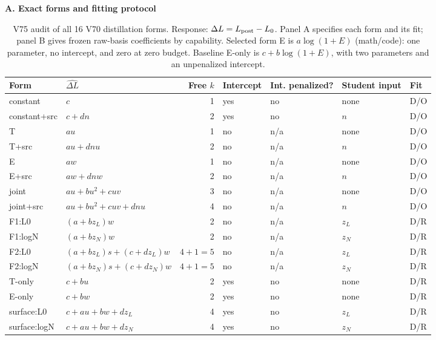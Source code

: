 \begin{table}[H]
\centering
\scriptsize
\setlength{\tabcolsep}{3pt}
\caption{V75 audit of all 16 V70 distillation forms. Response: $\Delta L=L_{\rm post}-L_0$. Panel A specifies each form and its fit; panel B gives frozen raw-basis coefficients by capability. Selected form E is $a\log(1+E)$ (math/code): one parameter, no intercept, and zero at zero budget. Baseline E-only is $c+b\log(1+E)$, with two parameters and an unpenalized intercept.}
\label{tab:distill_forms_audit}
\textbf{A. Exact forms and fitting protocol}\par\smallskip
\begin{tabular}{@{}llrllll@{}}
\toprule
Form & $\widehat{\Delta L}$ & Free $k$ & Intercept & Int. penalized? & Student input & Fit \\
\midrule
constant & $c$ & 1 & yes & no & none & D/O \\
constant+src & $c+d n$ & 2 & yes & no & $n$ & D/O \\
T & $a u$ & 1 & no & n/a & none & D/O \\
T+src & $a u+d n u$ & 2 & no & n/a & $n$ & D/O \\
E & $a w$ & 1 & no & n/a & none & D/O \\
E+src & $a w+d n w$ & 2 & no & n/a & $n$ & D/O \\
joint & $a u+b u^2+c u v$ & 3 & no & n/a & none & D/O \\
joint+src & $a u+b u^2+c u v+d n u$ & 4 & no & n/a & $n$ & D/O \\
F1:L0 & $(a+b z_L)w$ & 2 & no & n/a & $z_L$ & D/R \\
F1:logN & $(a+b z_N)w$ & 2 & no & n/a & $z_N$ & D/R \\
F2:L0 & $(a+b z_L)s+(c+d z_L)w$ & $4+1=5$ & no & n/a & $z_L$ & D/R \\
F2:logN & $(a+b z_N)s+(c+d z_N)w$ & $4+1=5$ & no & n/a & $z_N$ & D/R \\
T-only & $c+b u$ & 2 & yes & no & none & D/R \\
E-only & $c+b w$ & 2 & yes & no & none & D/R \\
surface:L0 & $c+a u+b w+d z_L$ & 4 & yes & no & $z_L$ & D/R \\
surface:logN & $c+a u+b w+d z_N$ & 4 & yes & no & $z_N$ & D/R \\
\bottomrule
\end{tabular}
\par\smallskip
\begin{minipage}{\textwidth}\scriptsize

\end{minipage}
\end{table}
